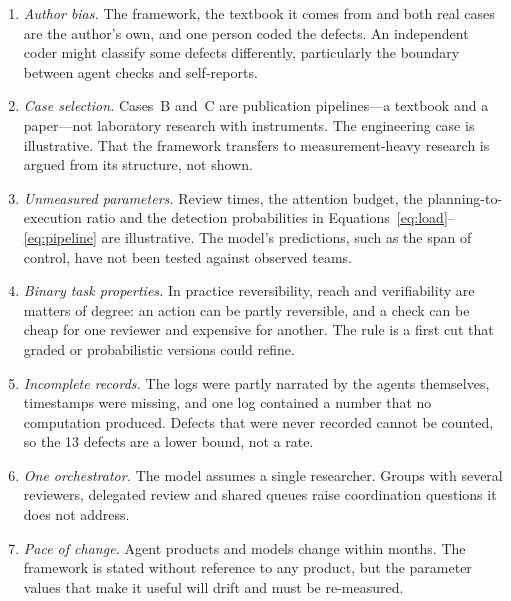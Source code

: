 \begin{enumerate}[leftmargin=*]
  \item \textit{Author bias.} The framework, the textbook it comes from and both real
    cases are the author's own, and one person coded the defects. An independent coder
    might classify some defects differently, particularly the boundary between agent
    checks and self-reports.
  \item \textit{Case selection.} Cases~B and~C are publication pipelines---a textbook and
    a paper---not laboratory research with instruments. The engineering case is
    illustrative. That the framework transfers to measurement-heavy research is argued
    from its structure, not shown.
  \item \textit{Unmeasured parameters.} Review times, the attention budget, the
    planning-to-execution ratio and the detection probabilities in
    Equations~\eqref{eq:load}--\eqref{eq:pipeline} are illustrative. The model's
    predictions, such as the span of control, have not been tested against observed
    teams.
  \item \textit{Binary task properties.} In practice reversibility, reach and
    verifiability are matters of degree: an action can be partly reversible, and a check
    can be cheap for one reviewer and expensive for another. The rule is a first cut that
    graded or probabilistic versions could refine.
  \item \textit{Incomplete records.} The logs were partly narrated by the agents
    themselves, timestamps were missing, and one log contained a number that no
    computation produced. Defects that were never recorded cannot be counted, so the 13
    defects are a lower bound, not a rate.
  \item \textit{One orchestrator.} The model assumes a single researcher. Groups with
    several reviewers, delegated review and shared queues raise coordination questions it
    does not address.
  \item \textit{Pace of change.} Agent products and models change within months. The
    framework is stated without reference to any product, but the parameter values that
    make it useful will drift and must be re-measured.
\end{enumerate}
